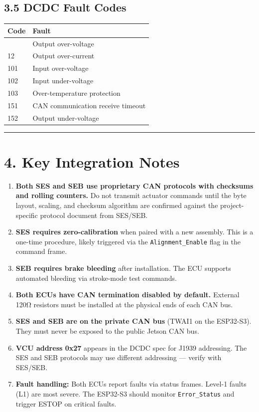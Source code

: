 \documentclass[12pt,a4paper,oneside]{report}
\begin{document}
\subsection{3.5 DCDC Fault Codes}\label{dcdc-fault-codes}

\begin{longtable}[]{@{}ll@{}}
\toprule\noalign{}
Code & Fault \\
\midrule\noalign{}
\endhead
\bottomrule\noalign{}
\endlastfoot
11 & Output over-voltage \\
12 & Output over-current \\
101 & Input over-voltage \\
102 & Input under-voltage \\
103 & Over-temperature protection \\
151 & CAN communication receive timeout \\
152 & Output under-voltage \\
\end{longtable}

\begin{center}\rule{0.5\linewidth}{0.5pt}\end{center}

\section{4. Key Integration Notes}\label{key-integration-notes}

\begin{enumerate}
\def\labelenumi{\arabic{enumi}.}
\item
  \textbf{Both SES and SEB use proprietary CAN protocols with checksums and
  rolling counters.} Do not transmit actuator commands until the byte layout,
  scaling, and checksum algorithm are confirmed against the project-specific
  protocol document from SES/SEB.
\item
  \textbf{SES requires zero-calibration} when paired with a new assembly. This
  is a one-time procedure, likely triggered via the \texttt{Alignment\_Enable}
  flag in the command frame.
\item
  \textbf{SEB requires brake bleeding} after installation. The ECU supports
  automated bleeding via stroke-mode test commands.
\item
  \textbf{Both ECUs have CAN termination disabled by default.} External 120Ω
  resistors must be installed at the physical ends of each CAN bus.
\item
  \textbf{SES and SEB are on the private CAN bus} (TWAI1 on the ESP32-S3).
  They must never be exposed to the public Jetson CAN bus.
\item
  \textbf{VCU address 0x27} appears in the DCDC spec for J1939 addressing. The
  SES and SEB protocols may use different addressing --- verify with SES/SEB.
\item
  \textbf{Fault handling:} Both ECUs report faults via status frames. Level-1
  faults (L1) are most severe. The ESP32-S3 should monitor
  \texttt{Error\_Status} and trigger ESTOP on critical faults.
\end{enumerate}
\end{document}
